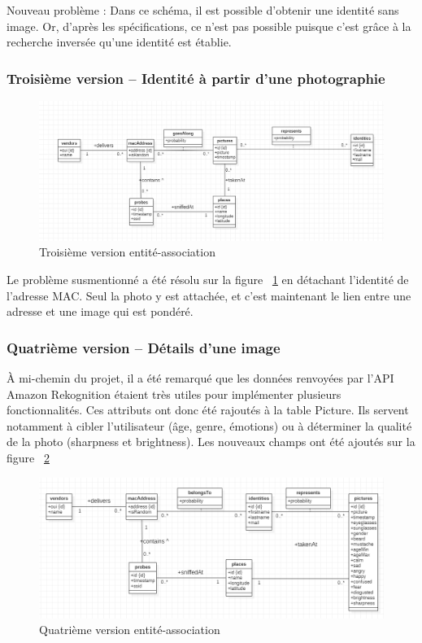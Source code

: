 Nouveau problème : Dans ce schéma, il est possible d’obtenir une identité sans image. Or, d’après les
spécifications, ce n’est pas possible puisque c’est grâce à la recherche inversée qu’une identité est établie.

\subsubsection{Troisième version – Identité à partir d’une photographie}

\begin{figure}[H]
	\centering
	\includegraphics[width=12cm]{images/proto-3.png}
	\caption{Troisième version entité-association}
	\label{fig:model-ea-3}
\end{figure}

Le problème susmentionné a été résolu sur la figure ~\ref{fig:model-ea-3} en détachant l’identité de l’adresse MAC. Seul la photo y est attachée, et
c’est maintenant le lien entre une adresse et une image qui est pondéré.

\subsubsection{Quatrième version – Détails d'une image}

À mi-chemin du projet, il a été remarqué que les données renvoyées par l'API Amazon Rekognition étaient très utiles 
pour implémenter plusieurs fonctionnalités. Ces attributs ont donc été rajoutés à la table Picture.
Ils servent notamment à cibler l'utilisateur (âge, genre, émotions) ou à déterminer la qualité de la photo (sharpness et brightness).
Les nouveaux champs ont été ajoutés sur la figure ~\ref{fig:model-ea-4}

\begin{figure}[H]
	\centering
	\includegraphics[width=12cm]{images/database_4.png}
	\caption{Quatrième version entité-association}
	\label{fig:model-ea-4}
\end{figure}


